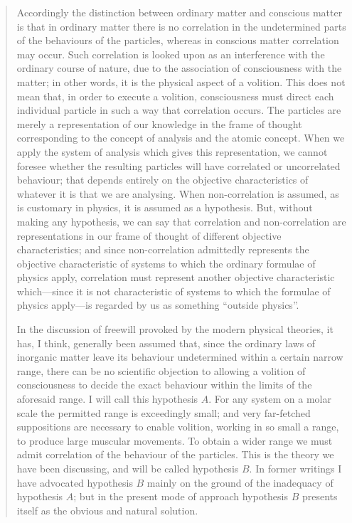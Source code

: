 \begin{quote}
    Accordingly the distinction between ordinary matter and conscious matter is that in ordinary matter there is no correlation in the undetermined parts of the behaviours of the particles, whereas in conscious matter correlation may occur.  Such correlation is looked upon as an interference with the ordinary course of nature, due to the association of consciousness with the matter; in other words, it is the physical aspect of a volition.  This does not mean that, in order to execute a volition, consciousness must direct each individual particle in such a way that correlation occurs.  The particles are merely a representation of our knowledge in the frame of thought corresponding to the concept of analysis and the atomic concept.  When we apply the system of analysis which gives this representation, we cannot foresee whether the resulting particles will have correlated or uncorrelated behaviour; that depends entirely on the objective characteristics of whatever it is that we are analysing.  When non-correlation is assumed, as is customary in physics, it is assumed as a hypothesis.  But, without making any hypothesis, we can say that correlation and non-correlation are representations in our frame of thought of different objective characteristics; and since non-correlation admittedly represents the objective characteristic of systems to which the ordinary formulae of physics apply, correlation must represent another objective characteristic which---since it is not characteristic of systems to which the formulae of physics apply---is regarded by us as something ``outside physics''.

    In the discussion of freewill provoked by the modern physical theories, it has, I think, generally been assumed that, since the ordinary laws of inorganic matter leave its behaviour undetermined within a certain narrow range, there can be no scientific objection to allowing a volition of consciousness to decide the exact behaviour within the limits of the aforesaid range.  I will call this hypothesis $A$.  For any system on a molar scale the permitted range is exceedingly small; and very far-fetched suppositions are necessary to enable volition, working in so small a range, to produce large muscular movements.  To obtain a wider range we must admit correlation of the behaviour of the particles.  This is the theory we have been discussing, and will be called hypothesis $B$.  In former writings I have advocated hypothesis $B$ mainly on the ground of the inadequacy of hypothesis $A$; but in the present mode of approach hypothesis $B$ presents itself as the obvious and natural solution.  


\end{quote}
